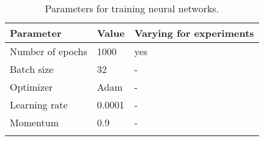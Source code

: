 \begin{table}[ht!]
\begin{center}
\caption{Parameters for training neural networks.}
\begin{tabular}{ M{6cm}  M{2cm} M{2cm}}
\toprule
\textbf{Parameter} & \textbf{Value} & \textbf{Varying for experiments} \\
\midrule
Number of epochs & 1000 & yes\\
Batch size & 32 & -\\
\midrule
Optimizer & Adam & -\\
Learning rate & 0.0001 & -\\
Momentum & 0.9 & -\\
\bottomrule
\label{tab:exp_details_params_train}
\end{tabular}
\end{center}
\end{table}
\FloatBarrier
\noindent